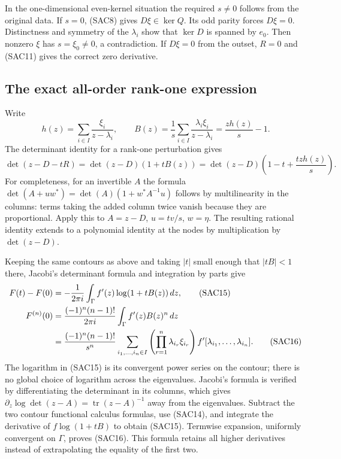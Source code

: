 In the one-dimensional even-kernel situation the required
$s\ne0$ follows from the original data. If $s=0$, (SAC8)
gives $D\xi\in\ker Q$. Its odd parity forces $D\xi=0$.
Distinctness and symmetry of the $\lambda_i$ show that
$\ker D$ is spanned by $e_0$. Then nonzero $\xi$ has
$s=\xi_0\ne0$, a contradiction. If $D\xi=0$ from the outset,
$R=0$ and (SAC11) gives the correct zero derivative.

\subsection{The exact all-order rank-one expression}

Write
\begin{equation}\tag{SAC13}
 h(z)=\sum_{i\in I}\frac{\xi_i}{z-\lambda_i},\qquad
 B(z)=\frac1s\sum_{i\in I}\frac{\lambda_i\xi_i}{z-\lambda_i}
     =\frac{z h(z)}s-1.
\end{equation}
The determinant identity for a rank-one perturbation gives
\begin{equation}\tag{SAC14}
 \det(z-D-tR)=\det(z-D)(1+tB(z))
             =\det(z-D)\left(1-t+\frac{tz h(z)}s\right).
\end{equation}
For completeness, for an invertible $A$ the formula
$\det(A+u w^*)=\det(A)(1+w^*A^{-1}u)$ follows by
multilinearity in the columns: terms taking the added column
twice vanish because they are proportional. Apply this to
$A=z-D$, $u=tv/s$, $w=\eta$. The resulting rational identity
extends to a polynomial identity at the nodes by multiplication
by $\det(z-D)$.

Keeping the same contours as above and taking $|t|$ small
enough that $|tB|<1$ there, Jacobi's determinant formula and
integration by parts give
\begin{align}
 F(t)-F(0)
 &=-\frac1{2\pi i}\int_\Gamma f'(z)\log(1+tB(z))\,dz,
                                                        \tag{SAC15}\\
 F^{(n)}(0)
 &=\frac{(-1)^n(n-1)!}{2\pi i}
           \int_\Gamma f'(z)B(z)^n\,dz\notag\\
 &=\frac{(-1)^n(n-1)!}{s^n}
   \sum_{i_1,\ldots,i_n\in I}
       \left(\prod_{r=1}^n\lambda_{i_r}\xi_{i_r}\right)
       f'[\lambda_{i_1},\ldots,\lambda_{i_n}].
                                                        \tag{SAC16}
\end{align}
The logarithm in (SAC15) is its convergent power series on
the contour; there is no global choice of logarithm across
the eigenvalues. Jacobi's formula is verified by differentiating
the determinant in its columns, which gives
$\partial_z\log\det(z-A)=\operatorname{tr}(z-A)^{-1}$
away from the eigenvalues. Subtract the two contour functional
calculus formulas, use (SAC14), and integrate the derivative of
$f\log(1+tB)$ to obtain (SAC15). Termwise expansion, uniformly
convergent on $\Gamma$, proves (SAC16). This formula retains
all higher derivatives instead of extrapolating the equality
of the first two.

